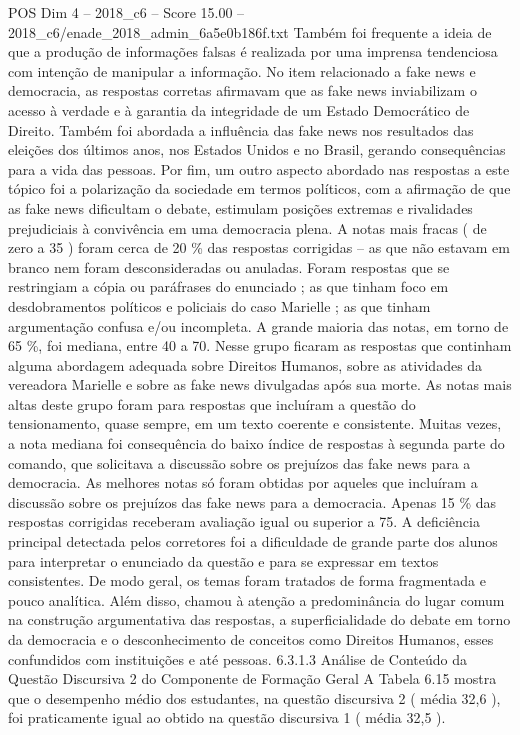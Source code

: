 \begin{textsample}{POS Dim 4 – 2018\_c6 – Score 15.00 – 2018\_c6/enade\_2018\_admin\_6a5e0b186f.txt}
Também foi frequente a ideia de que a produção de informações falsas é realizada por uma imprensa tendenciosa com intenção de manipular a informação.
No item relacionado a fake news e democracia, as respostas corretas afirmavam que as fake news inviabilizam o acesso à verdade e à garantia da integridade de um Estado Democrático de Direito.
Também foi abordada a influência das fake news nos resultados das eleições dos últimos anos, nos Estados Unidos e no Brasil, gerando consequências para a vida das pessoas.
Por fim, um outro aspecto abordado nas respostas a este tópico foi a polarização da sociedade em termos políticos, com a afirmação de que as fake news dificultam o debate, estimulam posições extremas e rivalidades prejudiciais à convivência em uma democracia plena.
A notas mais fracas ( de zero a 35 ) foram cerca de 20 \% das respostas corrigidas – as que não estavam em branco nem foram desconsideradas ou anuladas.
Foram respostas que se restringiam a cópia ou paráfrases do enunciado ; as que tinham foco em desdobramentos políticos e policiais do caso Marielle ; as que tinham argumentação confusa e/ou incompleta.
A grande maioria das notas, em torno de 65 \%, foi mediana, entre 40 a 70.
Nesse grupo ficaram as respostas que continham alguma abordagem adequada sobre Direitos Humanos, sobre as atividades da vereadora Marielle e sobre as fake news divulgadas após sua morte.
As notas mais altas deste grupo foram para respostas que incluíram a questão do tensionamento, quase sempre, em um texto coerente e consistente.
Muitas vezes, a nota mediana foi consequência do baixo índice de respostas à segunda parte do comando, que solicitava a discussão sobre os prejuízos das fake news para a democracia.
As melhores notas só foram obtidas por aqueles que incluíram a discussão sobre os prejuízos das fake news para a democracia.
Apenas 15 \% das respostas corrigidas receberam avaliação igual ou superior a 75.
A deficiência principal detectada pelos corretores foi a dificuldade de grande parte dos alunos para interpretar o enunciado da questão e para se expressar em textos consistentes.
De modo geral, os temas foram tratados de forma fragmentada e pouco analítica.
Além disso, chamou à atenção a predominância do lugar comum na construção argumentativa das respostas, a superficialidade do debate em torno da democracia e o desconhecimento de conceitos como Direitos Humanos, esses confundidos com instituições e até pessoas. 6.3.1.3 Análise de Conteúdo da Questão Discursiva 2 do Componente de Formação Geral A Tabela 6.15 mostra que o desempenho médio dos estudantes, na questão discursiva 2 ( média 32,6 ), foi praticamente igual ao obtido na questão discursiva 1 ( média 32,5 ).

\end{textsample}
